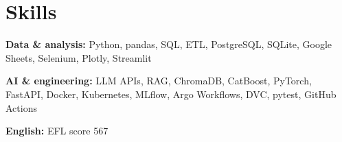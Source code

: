 \documentclass[11pt,a4paper]{article}
\begin{document}
\section{Skills}
\textbf{Data \& analysis:} Python, pandas, SQL, ETL, PostgreSQL, SQLite, Google Sheets, Selenium, Plotly, Streamlit\par\vspace{3pt}
\textbf{AI \& engineering:} LLM APIs, RAG, ChromaDB, CatBoost, PyTorch, FastAPI, Docker, Kubernetes, MLflow, Argo Workflows, DVC, pytest, GitHub Actions\par\vspace{3pt}
\textbf{English:} EFL score 567\par\vspace{3pt}
\end{document}

